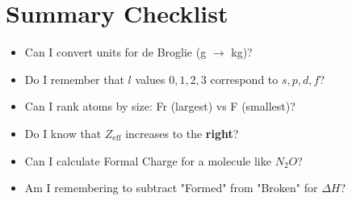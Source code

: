 \documentclass[11pt]{article}
\begin{document}
\section{Summary Checklist}
\begin{itemize}
    \item [ ] Can I convert units for de Broglie (g $\rightarrow$ kg)?
    \item [ ] Do I remember that $l$ values $0, 1, 2, 3$ correspond to $s, p, d, f$?
    \item [ ] Can I rank atoms by size: Fr (largest) vs F (smallest)?
    \item [ ] Do I know that $Z_{\text{eff}}$ increases to the \textbf{right}?
    \item [ ] Can I calculate Formal Charge for a molecule like $N_2O$?
    \item [ ] Am I remembering to subtract "Formed" from "Broken" for $\Delta H$?
\end{itemize}
\end{document}
